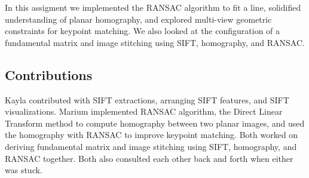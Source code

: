 In this assigment we implemented the RANSAC algorithm to fit a line, solidified understanding of planar homography, and explored multi-view geometric constraints for keypoint matching. We also looked at the configuration of a fundamental matrix and image stitching using SIFT, homography, and RANSAC.

\subsection{Contributions}
Kayla contributed with SIFT extractions, arranging SIFT features, and SIFT visualizations. Marium implemented RANSAC algorithm, the Direct Linear Transform method to compute homography between two planar images, and used the homography with RANSAC to improve keypoint matching. Both worked on deriving fundamental matrix and image stitching using SIFT, homography, and RANSAC together. Both also consulted each other back and forth when either was stuck. 